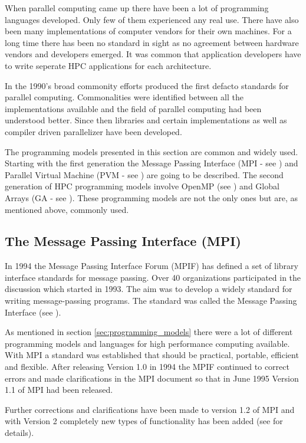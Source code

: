 When parallel computing came up there have been a lot of programming
languages developed. Only few of them experienced any real use. There
have also been many implementations of computer vendors for their own
machines. For a long time there has been no standard in sight as no
agreement between hardware vendors and developers emerged. It was
common that application developers have to write seperate HPC
applications for each architecture.

In the 1990's broad commonity efforts produced the first defacto
standards for parallel computing. Commonalities were identified
between all the implementations available and the field of parallel
computing had been understood better. Since then libraries and certain
implementations as well as compiler driven parallelizer have been
developed.

The programming models presented in this section are common and widely
used. Starting with the first generation the Message Passing Interface
(MPI - see \cite{forum94:MPI}) and Parallel Virtual Machine (PVM - see
\cite{geist94pvm})
are going to be described. The second generation of HPC programming
models involve OpenMP (see \cite{openMP05}) and Global Arrays (GA - see
\cite{nieplocha96gan}). These programming models are not the only ones
but are, as mentioned above, commonly used. 

\subsection{The Message Passing Interface (MPI)}
\label{sec:MPI}

In 1994 the Message Passing Interface Forum (MPIF) has defined a set
of library interface standards for message passing. Over 40
organizations participated in the discussion which started in
1993. The aim was to develop a widely standard for writing
message-passing programs. The standard was called the Message Passing
Interface (see \cite{forum94:MPI}).

As mentioned in section \ref{sec:programming_models} there
were a lot of different programming models and languages for high
performance computing available. With MPI a standard was established
that should be practical, portable, efficient and flexible. After
releasing Version 1.0 in 1994 the MPIF continued to correct errors and
made clarifications in the MPI document so that in June 1995 Version
1.1 of MPI had been released.

Further corrections and clarifications have been made to version 1.2 of
MPI and with Version 2 completely new types of functionality has been
added (see \cite{forum94:MPI-2} for details).

